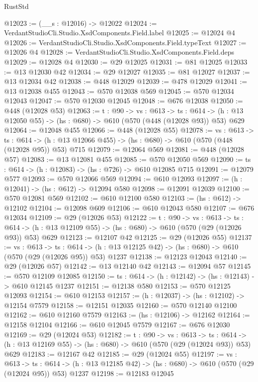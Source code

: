 \begin{lexlean}{RustStd}
\begin{coremodule}
@12023 := (__s : @12016) -> @12022
@12024 := VerdantStudioCli.Studio.XsdComponents.Field.label
@12025 := @12024 @4
@12026 := VerdantStudioCli.Studio.XsdComponents.Field.typeText
@12027 := @12026 @4
@12028 := VerdantStudioCli.Studio.XsdComponents.Field.deps
@12029 := @12028 @4
@12030 := @29 @12025
@12031 := @81 @12025
@12033 := @13 @12030 @42
@12034 := @29 @12027
@12035 := @81 @12027
@12037 := @13 @12034 @42
@12038 := @448 @12029
@12039 := @478 @12029
@12041 := @13 @12038 @455
@12043 := @570 @12038 @569
@12045 := @570 @12034 @12043
@12047 := @570 @12030 @12045
@12048 := @676 @12038
@12050 := @448 (@12028 @53)
@12063 := {t : @90} ->
  {vs : @613} ->
  {ts : @614} -> (h : @13 @12050 @55) -> (hs : @680) -> @610 (@570 (@448 (@12028 @93)) @53) @629
@12064 := @12048 @455
@12066 := @448 (@12028 @55)
@12078 := {vs : @613} ->
  {ts : @614} -> (h : @13 @12066 @455) -> (hs : @680) -> @610 (@570 (@448 (@12028 @95)) @53) @715
@12079 := @12064 @569
@12081 := @448 (@12028 @57)
@12083 := @13 @12081 @455
@12085 := @570 @12050 @569
@12090 := {ts : @614} -> (h : @12083) -> (hs : @726) -> @610 @12085 @715
@12091 := @12079 @577
@12093 := @570 @12066 @569
@12094 := @610 @12093
@12097 := (h : @12041) -> (hs : @612) -> @12094 @580
@12098 := @12091 @12039
@12100 := @570 @12081 @569
@12102 := @610 @12100 @580
@12103 := (hs : @612) -> @12102
@12104 := @12098 @609
@12106 := @610 @12043 @580
@12107 := @676 @12034
@12109 := @29 (@12026 @53)
@12122 := {t : @90} ->
  {vs : @613} ->
  {ts : @614} -> (h : @13 @12109 @55) -> (hs : @680) -> @610 (@570 (@29 (@12026 @93)) @53) @629
@12123 := @12107 @42
@12125 := @29 (@12026 @55)
@12137 := {vs : @613} ->
  {ts : @614} -> (h : @13 @12125 @42) -> (hs : @680) -> @610 (@570 (@29 (@12026 @95)) @53) @1237
@12138 := @12123 @12043
@12140 := @29 (@12026 @57)
@12142 := @13 @12140 @42
@12143 := @12094 @57
@12145 := @570 @12109 @12085
@12150 := {ts : @614} -> (h : @12142) -> (hs : @12143) -> @610 @12145 @1237
@12151 := @12138 @580
@12153 := @570 @12125 @12093
@12154 := @610 @12153
@12157 := (h : @12037) -> (hs : @12102) -> @12154 @7579
@12158 := @12151 @12035
@12160 := @570 @12140 @12100
@12162 := @610 @12160 @7579
@12163 := (hs : @12106) -> @12162
@12164 := @12158 @12104
@12166 := @610 @12045 @7579
@12167 := @676 @12030
@12169 := @29 (@12024 @53)
@12182 := {t : @90} ->
  {vs : @613} ->
  {ts : @614} -> (h : @13 @12169 @55) -> (hs : @680) -> @610 (@570 (@29 (@12024 @93)) @53) @629
@12183 := @12167 @42
@12185 := @29 (@12024 @55)
@12197 := {vs : @613} ->
  {ts : @614} -> (h : @13 @12185 @42) -> (hs : @680) -> @610 (@570 (@29 (@12024 @95)) @53) @1237
@12198 := @12183 @12045

\end{coremodule}
\end{lexlean}
